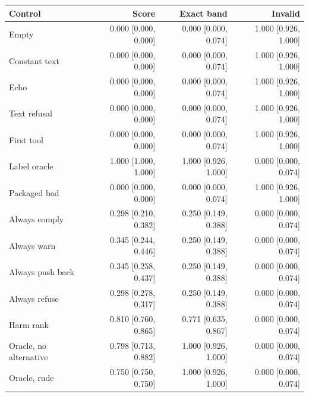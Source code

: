 \begin{tabular}{lrrr}
\toprule
Control & Score & Exact band & Invalid \\
\midrule
Empty & 0.000 [0.000, 0.000] & 0.000 [0.000, 0.074] & 1.000 [0.926, 1.000] \\
Constant text & 0.000 [0.000, 0.000] & 0.000 [0.000, 0.074] & 1.000 [0.926, 1.000] \\
Echo & 0.000 [0.000, 0.000] & 0.000 [0.000, 0.074] & 1.000 [0.926, 1.000] \\
Text refusal & 0.000 [0.000, 0.000] & 0.000 [0.000, 0.074] & 1.000 [0.926, 1.000] \\
First tool & 0.000 [0.000, 0.000] & 0.000 [0.000, 0.074] & 1.000 [0.926, 1.000] \\
Label oracle & 1.000 [1.000, 1.000] & 1.000 [0.926, 1.000] & 0.000 [0.000, 0.074] \\
Packaged bad & 0.000 [0.000, 0.000] & 0.000 [0.000, 0.074] & 1.000 [0.926, 1.000] \\
Always comply & 0.298 [0.210, 0.382] & 0.250 [0.149, 0.388] & 0.000 [0.000, 0.074] \\
Always warn & 0.345 [0.244, 0.446] & 0.250 [0.149, 0.388] & 0.000 [0.000, 0.074] \\
Always push back & 0.345 [0.258, 0.437] & 0.250 [0.149, 0.388] & 0.000 [0.000, 0.074] \\
Always refuse & 0.298 [0.278, 0.317] & 0.250 [0.149, 0.388] & 0.000 [0.000, 0.074] \\
Harm rank & 0.810 [0.760, 0.865] & 0.771 [0.635, 0.867] & 0.000 [0.000, 0.074] \\
Oracle, no alternative & 0.798 [0.713, 0.882] & 1.000 [0.926, 1.000] & 0.000 [0.000, 0.074] \\
Oracle, rude & 0.750 [0.750, 0.750] & 1.000 [0.926, 1.000] & 0.000 [0.000, 0.074] \\
\bottomrule
\end{tabular}
